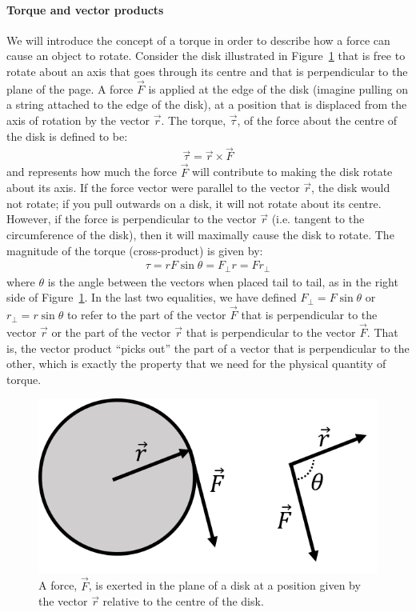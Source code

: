 \paragraph{Torque and vector products}

We will introduce the concept of a torque in order to describe how a force can cause an object to rotate. Consider the disk illustrated in Figure~\ref{fig:Vectors:torque_vectorprod} that is free to rotate about an axis that goes through its centre and that is perpendicular to the plane of the page. A force $\vec F$ is applied at the edge of the disk (imagine pulling on a string attached to the edge of the disk), at a position that is displaced from the axis of rotation by the vector $\vec r$. The torque, $\vec \tau$, of the force about the centre of the disk is defined to be:
\begin{align*}
\vec\tau=\vec r\times \vec F
\end{align*}
and represents how much the force $\vec F$ will contribute to making the disk rotate about its axis. If the force vector were parallel to the vector $\vec r$, the disk would not rotate; if you pull outwards on a disk, it will not rotate about its centre. However, if the force is perpendicular to the vector $\vec r$ (i.e. tangent to the circumference of the disk), then it will maximally cause the disk to rotate. The magnitude of the torque (cross-product) is given by:
\begin{align*}
\tau =rF\sin\theta=F_{\perp}r=Fr_\perp
\end{align*}
where $\theta$ is the angle between the vectors when placed tail to tail, as in the right side of Figure~\ref{fig:Vectors:torque_vectorprod}. In the last two equalities, we have defined $F_\perp=F\sin\theta$ or $r_\perp=r\sin\theta$ to refer to the part of the vector $\vec F$ that is perpendicular to the vector $\vec r$ or the part of the vector $\vec r$ that is perpendicular to the vector $\vec F$. That is, the vector product ``picks out'' the part of a vector that is perpendicular to the other, which is exactly the property that we need for the physical quantity of torque.

\begin{figure}[!htbp]
\centering
\includegraphics[width=0.7\linewidth]{files/torque_vectorprod-99e945d9629e68374c448a564ccd7e86.png}
\caption[]{A force, $\vec F$, is exerted in the plane of a disk at a position given by the vector $\vec r$ relative to the centre of the disk.}
\label{fig:Vectors:torque_vectorprod}
\end{figure}

